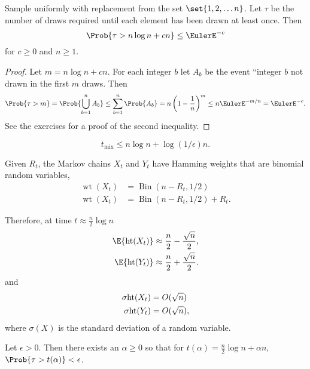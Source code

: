\documentclass[12pt]{article}
\begin{document}
\begin{lemma}
    Sample uniformly with replacement from the set \( \set{1, 2, \dots n}
    \).  Let \( \tau \) be the number of draws required until each
    element has been drawn at least once.  Then
    \[
        \Prob{\tau > n \log n + c n} \le \EulerE^{-c}
    \] for \( c \ge 0 \) and \( n \ge 1 \).
\end{lemma}

\begin{proof}
    Let \( m = n \log n + c n \).  For each integer \( b \) let \( A_b \)
    be the event ``integer \( b \) not drawn in the first \( m \) draws.
    Then
    \[
        \Prob{ \tau > m} = \Prob{ \bigcup_{b=1}^n A_b } \le \sum_{b=1}^n
        \Prob{A_b} = n \left( 1 - \frac{1}{n} \right)^m \le n \EulerE^{-m/n}
        = \EulerE^ {-c}.
    \] See the exercises for a proof of the second inequality.
\end{proof}

\begin{corollary}
    \[
        t_{\text{mix}} \le n \log n + \log(1/\epsilon) n.
    \]
\end{corollary}

Given \( R_t \), the Markov chains \( X_t \) and \( Y_t \) have Hamming
weights that are binomial random variables,
\begin{align*}
    \operatorname{wt}
    (X_t) &=
    \operatorname{Bin}
    (n - R_t, 1/2) \\
    \operatorname{wt}
    (X_t) &=
    \operatorname{Bin}
    (n - R_t, 1/2) + R_t.
\end{align*}

Therefore, at time \( t \approx \frac{n}{2} \log n \)
\begin{align*}
    \E{%
    \operatorname{ht}
    (X_t)} &\approx \frac{n}{2} - \frac{\sqrt{n}}{2}, \\
    \E{%
    \operatorname{ht}
    (Y_t)} &\approx \frac{n}{2} + \frac{\sqrt{n}}{2}.
\end{align*}
and
\begin{align*}
    \sigma{%
    \operatorname{ht}
    (X_t)} &= O(\sqrt{n}) \\
    \sigma{%
    \operatorname{ht}
    (Y_t)} &= O(\sqrt{n}),
\end{align*}
where \( \sigma(X) \) is the standard deviation of a random variable.

\begin{theorem}
    Let \( \epsilon > 0 \).  Then there exists an \( \alpha \ge 0 \) so
    that for \( t(\alpha) = \frac{n}{2} \log n + \alpha n \), \( \Prob{\tau
    > t(\alpha)} < \epsilon \).
\end{theorem}
\end{document}
